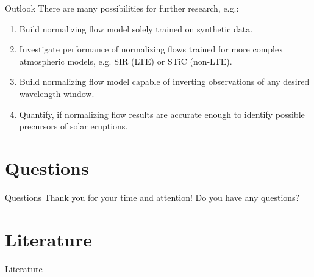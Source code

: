 \documentclass{beamer}
\begin{document}
\begin{frame}[allowframebreaks]{Outlook}
	There are many possibilities for further research, e.g.:
	\begin{enumerate}
\item Build normalizing flow model solely trained on synthetic data. %
\item Investigate performance of normalizing flows trained for more complex atmospheric models, e.g. SIR (LTE) or STiC (non-LTE). %
\item Build normalizing flow model capable of inverting observations of any desired wavelength window. %
\item Quantify, if normalizing flow results are accurate enough to identify possible precursors of solar eruptions.
	\end{enumerate}%
\end{frame}

\section*{Questions}
\begin{frame}[allowframebreaks]{Questions}
Thank you for your time and attention! Do you have any questions?
\end{frame}

\appendix

\section*{Literature}
\begin{frame}[allowframebreaks]{Literature}
\tiny


\end{frame}
\end{document}
